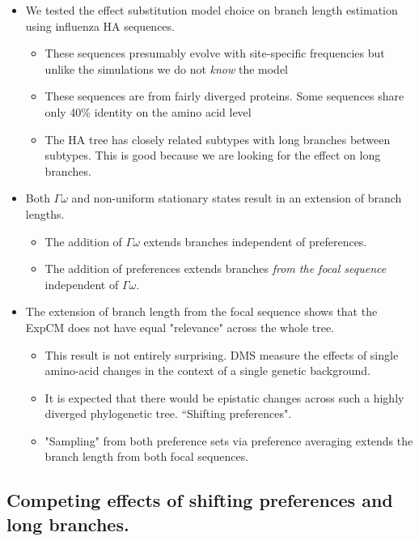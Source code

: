 \documentclass[11pt]{article}
\begin{document}
\begin{itemize}
\item We tested the effect substitution model choice on branch length estimation using influenza HA sequences. 
\begin{itemize}
\item These sequences presumably evolve with site-specific frequencies but unlike the simulations we do not \textit{know} the model
\item These sequences are from fairly diverged proteins. Some sequences share only 40\% identity on the amino acid level 
\item The HA tree has closely related subtypes with long branches between subtypes. This is good because we are looking for the effect on long branches. 
\end{itemize}
\item Both $\Gamma\omega$ and non-uniform stationary states result in an extension of branch lengths. 
\begin{itemize}
\item The addition of $\Gamma\omega$ extends branches independent of preferences. 
\item The addition of preferences extends branches \textit{from the focal sequence} independent of $\Gamma\omega$. 
\end{itemize}
\item The extension of branch length from the focal sequence shows that the ExpCM does not have equal "relevance" across the whole tree. 
\begin{itemize}
\item This result is not entirely surprising. DMS measure the effects of single amino-acid changes in the context of a single genetic background. 
\item It is expected that there would be epistatic changes across such a highly diverged phylogenetic tree. ``Shifting preferences".
\item "Sampling" from both preference sets via preference averaging extends the branch length from both focal sequences.
\end{itemize}
\end{itemize}

\subsection*{Competing effects of shifting preferences and long branches.}
\end{document}
